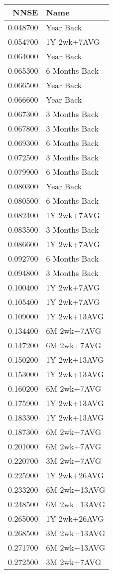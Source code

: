\begin{tabular}{rl}
NNSE & Name \\
\hline
0.048700 & Year Back \\
0.054700 & 1Y 2wk+7AVG \\
0.064000 & Year Back \\
0.065300 & 6 Months Back \\
0.066500 & Year Back \\
0.066600 & Year Back \\
0.067300 & 3 Months Back \\
0.067800 & 3 Months Back \\
0.069300 & 6 Months Back \\
0.072500 & 3 Months Back \\
0.079900 & 6 Months Back \\
0.080300 & Year Back \\
0.080500 & 6 Months Back \\
0.082400 & 1Y 2wk+7AVG \\
0.083500 & 3 Months Back \\
0.086600 & 1Y 2wk+7AVG \\
0.092700 & 6 Months Back \\
0.094800 & 3 Months Back \\
0.100400 & 1Y 2wk+7AVG \\
0.105400 & 1Y 2wk+7AVG \\
0.109000 & 1Y 2wk+13AVG \\
0.134400 & 6M 2wk+7AVG \\
0.147200 & 6M 2wk+7AVG \\
0.150200 & 1Y 2wk+13AVG \\
0.153000 & 1Y 2wk+13AVG \\
0.160200 & 6M 2wk+7AVG \\
0.175900 & 1Y 2wk+13AVG \\
0.183300 & 1Y 2wk+13AVG \\
0.187300 & 6M 2wk+7AVG \\
0.201000 & 6M 2wk+7AVG \\
0.220700 & 3M 2wk+7AVG \\
0.225900 & 1Y 2wk+26AVG \\
0.233200 & 6M 2wk+13AVG \\
0.248500 & 6M 2wk+13AVG \\
0.265000 & 1Y 2wk+26AVG \\
0.268500 & 3M 2wk+13AVG \\
0.271700 & 6M 2wk+13AVG \\
0.272500 & 3M 2wk+7AVG \\

\end{tabular}
